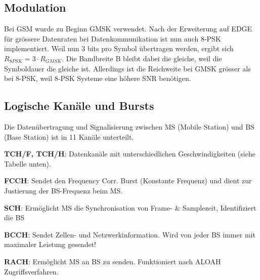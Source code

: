 \subsection{Modulation}
	Bei GSM wurde zu Beginn GMSK verwendet. Nach der Erweiterung auf EDGE für grössere Datenraten 
	bei Datenkommunikation ist nun auch 8-PSK implementiert. 
	Weil nun 3 bits pro Symbol übertragen werden, ergibt sich $R_{8PSK}=3\cdot R_{GMSK}$. Die 
	Bandbreite B bleibt dabei die gleiche, weil die Symboldauer die gleiche ist. Allerdings 
	ist die Reichweite bei GMSK grösser als bei 8-PSK, weil 8-PSK Systeme eine höhere SNR benötigen.
	
\subsection{Logische Kanäle und Bursts}
    Die Datenübertragung und Signalisierung zwischen MS (Mobile Station) und BS (Base Station) ist in 11 Kanäle 
    unterteilt.
    \begin{liste}
        \item \textbf{TCH/F, TCH/H}: Datenkanäle mit unterschiedlichen Geschwindigkeiten (siehe Tabelle unten).
        \item \textbf{FCCH}: Sendet den  Frequency Corr. Burst (Konstante Frequenz) und dient zur Justierung der BS-Frequenz beim MS.
        \item \textbf{SCH}: Ermöglicht MS die Synchronisation von Frame- \& Samplezeit, Identifiziert die BS
        \item \textbf{BCCH}: Sendet Zellen- und Netzwerkinformation. Wird von jeder BS immer mit maximaler Leistung gesendet!
        \item \textbf{RACH}: Ermöglicht MS an BS zu senden. Funktioniert nach ALOAH Zugriffsverfahren.
    \end{liste}

